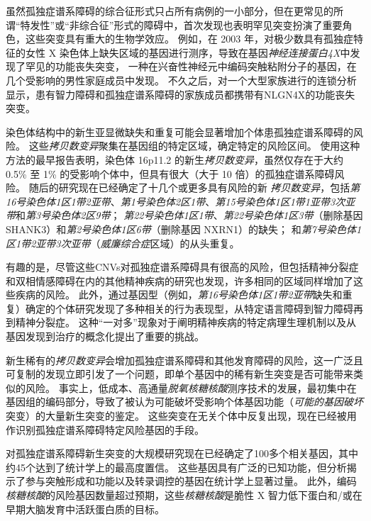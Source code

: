 虽然孤独症谱系障碍的综合征形式只占所有病例的一小部分，但在更常见的所谓“特发性”或“非综合征”形式的障碍中，首次发现也表明罕见突变扮演了重要角色，这些突变具有重大的生物学效应。
例如，在 2003 年，对极少数具有孤独症特征的女性 X 染色体上缺失区域的基因进行测序，导致在基因\textit{神经连接蛋白4X}中发现了罕见的功能丧失突变， 一种在兴奋性神经元中编码突触粘附分子的基因，在几个受影响的男性家庭成员中发现。
不久之后，对一个大型家族进行的连锁分析显示，患有智力障碍和孤独症谱系障碍的家族成员都携带有NLGN4X的功能丧失突变。


染色体结构中的新生亚显微缺失和重复可能会显著增加个体患孤独症谱系障碍的风险。
这些\textit{拷贝数变异}聚集在基因组的特定区域，确定特定的风险区间。
使用这种方法的最早报告表明，染色体 16p11.2 的新生\textit{拷贝数变异}，虽然仅存在于大约 0.5\% 至 1\% 的受影响个体中，但具有很大（大于 10 倍）的孤独症谱系障碍风险。
随后的研究现在已经确定了十几个或更多具有风险的新 \textit{拷贝数变异}，包括\textit{第16号染色体1区1带2亚带}、\textit{第1号染色体2区1带}、\textit{第15号染色体1区1带1亚带3次亚带}和\textit{第3号染色体2区9带}；
\textit{第22号染色体1区1带}、\textit{第22号染色体1区3带}（删除基因 SHANK3）和\textit{第2号染色体1区6带}（删除基因 NXRN1）的缺失；
和\textit{第7号染色体1区1带2亚带3次亚带}（\textit{威廉综合症}区域）的从头重复。


有趣的是，尽管这些CNVs对孤独症谱系障碍具有很高的风险，但包括精神分裂症和双相情感障碍在内的其他精神疾病的研究也发现，许多相同的区域同样增加了这些疾病的风险。
此外，通过基因型（例如，\textit{第16号染色体1区1带2亚带}缺失和重复）确定的个体研究发现了多种相关的行为表现型，从特定语言障碍到智力障碍再到精神分裂症。
这种“一对多”现象对于阐明精神疾病的特定病理生理机制以及从基因发现到治疗的概念化提出了重要的挑战。


新生稀有的\textit{拷贝数变异}会增加孤独症谱系障碍和其他发育障碍的风险，这一广泛且可复制的发现立即引发了一个问题，即单个基因中的稀有新生突变是否可能带来类似的风险。
事实上，低成本、高通量\textit{脱氧核糖核酸}测序技术的发展，最初集中在基因组的编码部分，导致了被认为可能破坏受影响个体基因功能（\textit{可能的基因破坏}突变）的大量新生突变的鉴定。
这些突变在无关个体中反复出现，现在已经被用作识别孤独症谱系障碍特定风险基因的手段。

对孤独症谱系障碍新生突变的大规模研究现在已经确定了100多个相关基因，其中约45个达到了统计学上的最高度置信。
这些基因具有广泛的已知功能，但分析揭示了参与突触形成和功能以及转录调控的基因在统计学上显著过量。
此外，编码\textit{核糖核酸}的风险基因数量超过预期，这些\textit{核糖核酸}是脆性 X 智力低下蛋白和/或在早期大脑发育中活跃蛋白质的目标。



